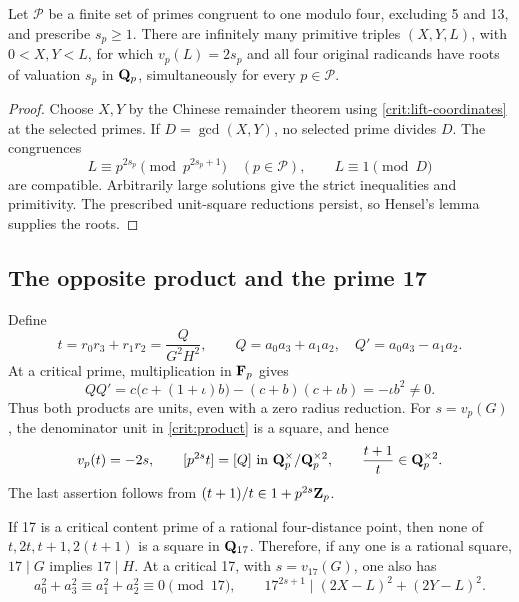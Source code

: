 \begin{corollary}\label{cor:crit-crt}
Let \(\mathcal P\) be a finite set of primes congruent to one modulo
four, excluding 5 and 13, and prescribe \(s_p\ge1\).
There are infinitely many primitive triples \((X,Y,L)\), with
\(0<X,Y<L\), for which \(v_p(L)=2s_p\) and all four original
radicands have roots of valuation \(s_p\) in \(\mathbf Q_p\), simultaneously
for every \(p\in\mathcal P\).
\end{corollary}

\begin{proof}
Choose \(X,Y\) by the Chinese remainder theorem using
\eqref{crit:lift-coordinates} at the selected primes. If
\(D=\gcd(X,Y)\), no selected prime divides \(D\). The congruences
\[
 L\equiv p^{2s_p}\pmod{p^{2s_p+1}}\quad(p\in\mathcal P),
 \qquad L\equiv1\pmod D
\]
are compatible. Arbitrarily large solutions give the strict
inequalities and primitivity. The prescribed unit-square reductions
persist, so Hensel's lemma supplies the roots.
\end{proof}

\subsection{The opposite product and the prime 17}

Define
\begin{equation}\label{crit:product}
 t=r_0r_3+r_1r_2=\frac{Q}{G^2H^2},\qquad
 Q=a_0a_3+a_1a_2,\quad Q'=a_0a_3-a_1a_2.
\end{equation}
At a critical prime, multiplication in \(\mathbf F_p\) gives
\begin{equation}\label{crit:product-unit}
 QQ'=c\bigl(c+(1+\iota)b\bigr)-(c+b)(c+\iota b)
     =-\iota b^2\ne0.
\end{equation}
Thus both products are units, even with a zero radius reduction.
For \(s=v_p(G)\), the denominator unit in \eqref{crit:product} is a
square, and hence
\begin{equation}\label{crit:product-class}
 v_p(t)=-2s,\qquad [p^{2s}t]=[Q]
 \text{ in }\mathbf Q_p^\times/\mathbf Q_p^{\times2},\qquad
 \frac{t+1}{t}\in\mathbf Q_p^{\times2}.
\end{equation}
The last assertion follows from
\((t+1)/t\in1+p^{2s}\mathbf Z_p\).

\begin{theorem}\label{thm:crit-17}
If 17 is a critical content prime of a rational four-distance point,
then none of \(t,2t,t+1,2(t+1)\) is a square in
\(\mathbf Q_{17}\). Therefore, if any one is a rational square,
\(17\mid G\) implies \(17\mid H\).
At a critical 17, with \(s=v_{17}(G)\), one also has
\[
 a_0^2+a_3^2\equiv a_1^2+a_2^2\equiv0\pmod{17},\qquad
 17^{2s+1}\mid(2X-L)^2+(2Y-L)^2.
\]
\end{theorem}

